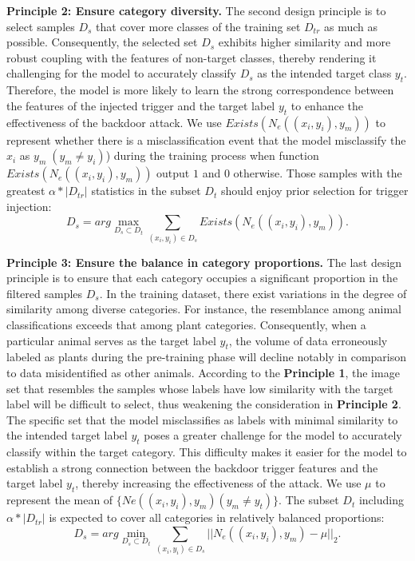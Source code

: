 \documentclass{article}
\begin{document}
\textbf{Principle 2: Ensure category diversity.} The second design principle is to select samples \(D_s\) that cover more classes of the training set \(D_{tr}\) as much as possible. Consequently, the selected set \(D_s\) exhibits higher similarity and more robust coupling with the features of non-target classes, thereby rendering it challenging for the model to accurately classify \(D_s\) as the intended target class \(y_t\). Therefore, the model is more likely to learn the strong correspondence between the features of the injected trigger and the target label \(y_t\) to enhance the effectiveness of the backdoor attack. We use \(Exists(N_e((x_i,y_i),y_m))\) to represent whether there is a misclassification event that the model misclassify the \(x_i\) as \(y_m\;(y_m \neq y_i)\)) during the training process when function \(Exists(N_e((x_i,y_i),y_m))\) output \(1\) and \(0\) otherwise. Those samples with the greatest \(\alpha*|D_{tr}|\)  statistics in the subset \(D_t\) should enjoy prior selection for trigger injection:
\begin{equation}
D_s = arg \max_{D_s\subset D_t}\sum_{(x_i,y_i) \in D_s}Exists(N_e((x_i,y_i),y_m)).
\end{equation}

\textbf{Principle 3: Ensure the balance in category proportions.} The last design principle is to ensure that each category occupies a significant proportion in the filtered samples \(D_s\). In the training dataset, there exist variations in the degree of similarity among diverse categories. For instance, the resemblance among animal classifications exceeds that among plant categories. Consequently, when a particular animal serves as the target label \(y_t\), the volume of data erroneously labeled as plants during the pre-training phase will decline notably in comparison to data misidentified as other animals. According to the \textbf{Principle 1}, the image set that resembles the samples whose labels have low similarity with the target label will be difficult to select, thus weakening the consideration in \textbf{Principle 2}. The specific set that the model misclassifies as labels with minimal similarity to the intended target label \(y_t\) poses a greater challenge for the model to accurately classify within the target category. This difficulty makes it easier for the model to establish a strong connection between the backdoor trigger features and the target label \(y_t\), thereby increasing the effectiveness of the attack. We use \(\mu\) to represent the mean of \(\{N{e}((x_i,y_i),y_m)(y_m\neq y_t)\}\). The subset \(D_t\) including \(\alpha*|D_{tr}|\) is expected to cover all categories in relatively balanced proportions:
\begin{equation}
D_s = arg \min_{D_s\subset D_t}\sum_{(x_i,y_i) \in D_s}||N_{e}((x_i,y_i),y_m)-\mu||_2.
\end{equation}
\end{document}
